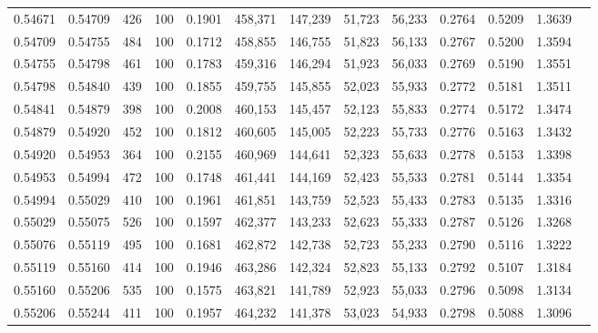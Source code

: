 \begin{tabular}{rrrrrrrrrrrrr}
0.54671 & 0.54709 &   426 & 100 &                                     0.1901 & 458,371 & 147,239 &  51,723 &  56,233 & 0.2764 & 0.5209 & 1.3639 \\
0.54709 & 0.54755 &   484 & 100 &                                     0.1712 & 458,855 & 146,755 &  51,823 &  56,133 & 0.2767 & 0.5200 & 1.3594 \\
0.54755 & 0.54798 &   461 & 100 &                                     0.1783 & 459,316 & 146,294 &  51,923 &  56,033 & 0.2769 & 0.5190 & 1.3551 \\
0.54798 & 0.54840 &   439 & 100 &                                     0.1855 & 459,755 & 145,855 &  52,023 &  55,933 & 0.2772 & 0.5181 & 1.3511 \\
0.54841 & 0.54879 &   398 & 100 &                                     0.2008 & 460,153 & 145,457 &  52,123 &  55,833 & 0.2774 & 0.5172 & 1.3474 \\
0.54879 & 0.54920 &   452 & 100 &                                     0.1812 & 460,605 & 145,005 &  52,223 &  55,733 & 0.2776 & 0.5163 & 1.3432 \\
0.54920 & 0.54953 &   364 & 100 &                                     0.2155 & 460,969 & 144,641 &  52,323 &  55,633 & 0.2778 & 0.5153 & 1.3398 \\
0.54953 & 0.54994 &   472 & 100 &                                     0.1748 & 461,441 & 144,169 &  52,423 &  55,533 & 0.2781 & 0.5144 & 1.3354 \\
0.54994 & 0.55029 &   410 & 100 &                                     0.1961 & 461,851 & 143,759 &  52,523 &  55,433 & 0.2783 & 0.5135 & 1.3316 \\
0.55029 & 0.55075 &   526 & 100 &                                     0.1597 & 462,377 & 143,233 &  52,623 &  55,333 & 0.2787 & 0.5126 & 1.3268 \\
0.55076 & 0.55119 &   495 & 100 &                                     0.1681 & 462,872 & 142,738 &  52,723 &  55,233 & 0.2790 & 0.5116 & 1.3222 \\
0.55119 & 0.55160 &   414 & 100 &                                     0.1946 & 463,286 & 142,324 &  52,823 &  55,133 & 0.2792 & 0.5107 & 1.3184 \\
0.55160 & 0.55206 &   535 & 100 &                                     0.1575 & 463,821 & 141,789 &  52,923 &  55,033 & 0.2796 & 0.5098 & 1.3134 \\
0.55206 & 0.55244 &   411 & 100 &                                     0.1957 & 464,232 & 141,378 &  53,023 &  54,933 & 0.2798 & 0.5088 & 1.3096 \\

\end{tabular}
